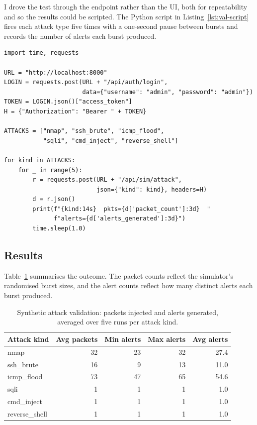 I drove the test through the  endpoint
rather than the UI, both for repeatability and so the results
could be scripted. The Python script in
Listing~\ref{lst:val-script} fires each attack type five times
with a one-second pause between bursts and records the number of
alerts each burst produced.

\begin{lstlisting}[style=pyfile,caption={Synthetic validation driver},label={lst:val-script}]
import time, requests

URL = "http://localhost:8000"
LOGIN = requests.post(URL + "/api/auth/login",
                      data={"username": "admin", "password": "admin"})
TOKEN = LOGIN.json()["access_token"]
H = {"Authorization": "Bearer " + TOKEN}

ATTACKS = ["nmap", "ssh_brute", "icmp_flood",
           "sqli", "cmd_inject", "reverse_shell"]

for kind in ATTACKS:
    for _ in range(5):
        r = requests.post(URL + "/api/sim/attack",
                          json={"kind": kind}, headers=H)
        d = r.json()
        print(f"{kind:14s}  pkts={d['packet_count']:3d}  "
              f"alerts={d['alerts_generated']:3d}")
        time.sleep(1.0)
\end{lstlisting}

\subsection{Results}
\label{sec:val-synthetic-results}

Table~\ref{tab:val-synthetic} summarises the outcome.
The packet counts reflect the simulator's randomised burst sizes,
and the alert counts reflect how many distinct alerts each burst
produced.

\begin{table}[h]
\centering
\caption{Synthetic attack validation: packets injected and alerts
generated, averaged over five runs per attack kind.}
\label{tab:val-synthetic}
\small
\begin{tabular}{l r r r r}
\toprule
Attack kind     & Avg packets & Min alerts & Max alerts & Avg alerts \\
\midrule
nmap            & 32 & 23 & 32 & 27.4 \\
ssh\_brute      & 16 &  9 & 13 & 11.0 \\
icmp\_flood     & 73 & 47 & 65 & 54.6 \\
sqli            &  1 &  1 &  1 &  1.0 \\
cmd\_inject     &  1 &  1 &  1 &  1.0 \\
reverse\_shell  &  1 &  1 &  1 &  1.0 \\
\bottomrule
\end{tabular}
\end{table}

